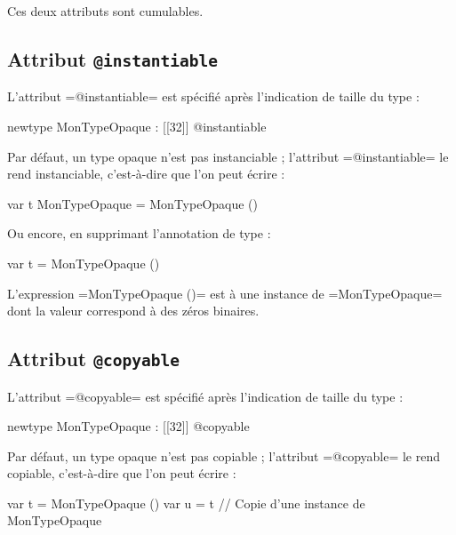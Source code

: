 Ces deux attributs sont cumulables.

\subsection{Attribut \texttt{@instantiable}}

L'attribut \plm=@instantiable= est spécifié après l'indication de taille du type :

\begin{PLM}
newtype MonTypeOpaque : [[32]] @instantiable
\end{PLM}


Par défaut, un type opaque n'est pas instanciable ; l'attribut \plm=@instantiable= le rend instanciable, c'est-à-dire que l'on peut écrire :

\begin{PLM}
var t MonTypeOpaque = MonTypeOpaque ()
\end{PLM}

Ou encore, en supprimant l'annotation de type :

\begin{PLM}
var t = MonTypeOpaque ()
\end{PLM}

L'expression \plm=MonTypeOpaque ()= est à une instance de \plm=MonTypeOpaque= dont la valeur correspond à des zéros binaires.






\subsection{Attribut \texttt{@copyable}}

L'attribut \plm=@copyable= est spécifié après l'indication de taille du type :

\begin{PLM}
newtype MonTypeOpaque : [[32]] @copyable
\end{PLM}


Par défaut, un type opaque n'est pas copiable ; l'attribut \plm=@copyable= le rend copiable, c'est-à-dire que l'on peut écrire :

\begin{PLM}
var t = MonTypeOpaque ()
var u = t // Copie d'une instance de MonTypeOpaque
\end{PLM}


